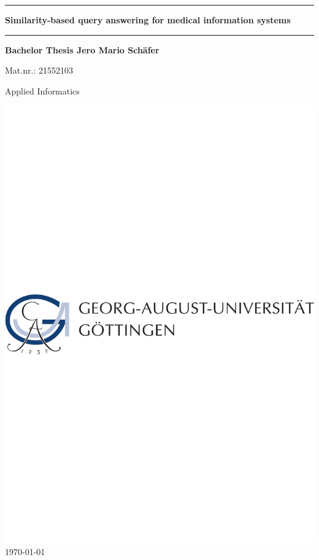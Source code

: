 
\newpage
\thispagestyle{empty}
\newcommand{\Rule}{\rule{\textwidth}{1mm}}

\begin{center}

\Rule\vspace{5mm}
\sffamily\bfseries\Huge
Similarity-based query answering for medical information systems
\vspace{1mm}\Rule
\vfill
\sffamily\bfseries\LARGE Bachelor Thesis
\vfill
\sffamily\bfseries\Large Jero Mario Schäfer\par Mat.nr.: 21552103\par Applied Informatics\par
\vfill

\includegraphics[width=\textwidth]{img/ugo-logo.pdf}
\vfill
\today
\end{center}

\newpage
\listoftodos
